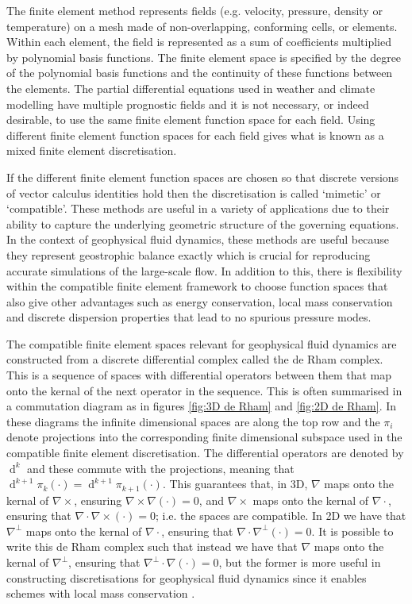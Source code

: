 \documentclass[journal abbreviation, manuscript]{copernicus}
\DeclareMathOperator{\diff}{d}
\begin{document}
The finite element method represents fields (e.g. velocity, pressure,
density or temperature) on a mesh made of non-overlapping, conforming
cells, or elements. Within each element, the field is represented as a
sum of coefficients multiplied by polynomial basis functions. The
finite element space is specified by the degree of the polynomial
basis functions and the continuity of these functions between the
elements. The partial differential equations used in weather and
climate modelling have multiple prognostic fields and it is not
necessary, or indeed desirable, to use the same finite element
function space for each field. Using different finite element function
spaces for each field gives what is known as a mixed finite element
discretisation.

If the different finite element function spaces are chosen so that
discrete versions of vector calculus identities hold then the
discretisation is called `mimetic' or `compatible'. These methods are
useful in a variety of applications due to their ability to capture
the underlying geometric structure of the governing equations. In the
context of geophysical fluid dynamics, these methods are useful
because they represent geostrophic balance exactly which is crucial
for reproducing accurate simulations of the large-scale flow. In
addition to this, there is flexibility within the compatible finite
element framework to choose function spaces that also give other
advantages such as energy conservation, local mass conservation and
discrete dispersion properties that lead to no spurious pressure
modes.

The compatible finite element spaces relevant for geophysical fluid
dynamics are constructed from a discrete differential complex called
the de Rham complex. This is a sequence of spaces with differential
operators between them that map onto the kernal of the next operator
in the sequence. This is often summarised in a commutation diagram as
in figures \ref{fig:3D de Rham} and \ref{fig:2D de Rham}. In these
diagrams the infinite dimensional spaces are along the top row and the
$\pi_i$ denote projections into the corresponding finite dimensional
subspace used in the compatible finite element discretisation. The
differential operators are denoted by $\diff^k$ and these commute with
the projections, meaning that $\diff^{k+1}\pi_k(\cdot) =
\diff^{k+1}\pi_{k+1}(\cdot)$. This guarantees that, in 3D, $\nabla$
maps onto the kernal of $\nabla\times$, ensuring
$\nabla\times\nabla(\cdot)=0$, and $\nabla\times$ maps onto the kernal
of $\nabla\cdot$, ensuring that $\nabla\cdot\nabla\times(\cdot)=0$;
i.e. the spaces are compatible. In 2D we have that $\nabla^\perp$ maps
onto the kernal of $\nabla\cdot$, ensuring that
$\nabla\cdot\nabla^\perp(\cdot)=0$. It is possible to write this de
Rham complex such that instead we have that $\nabla$ maps onto the
kernal of $\nabla^\perp$, ensuring that
$\nabla^\perp\cdot\nabla(\cdot)=0$, but the former is more useful in
constructing discretisations for geophysical fluid dynamics since it
enables schemes with local mass conservation \citep{}.
\end{document}
